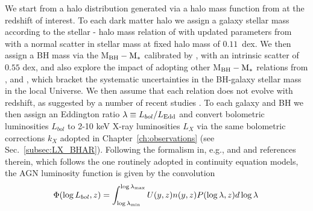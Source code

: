 We start from a halo distribution generated via a halo mass function from \citet{2008ApJ...688..709T} at the redshift of interest. To each dark matter halo we assign a galaxy stellar mass according to the stellar - halo mass relation of \citet[][]{moster10} with updated parameters from \citet[][Eq.~5]{2019MNRAS.483.2506G} with a normal scatter in stellar mass at fixed halo mass of $0.11$~dex.
We then assign a BH mass via the M$_{\rm BH}-{\rm M}_*$ calibrated by \citet{2015ApJ...813...82R}, with an intrinsic scatter of $0.55$ dex, and also explore the impact of adopting other M$_{\rm BH}-{\rm M}_*$ relations from \citet{2016MNRAS.460.3119S}, \citet{2018ApJ...869..113D} and \citet{2019ApJ...876..155S}, which bracket the systematic uncertainties in the BH-galaxy stellar mass in the local Universe. 
We then assume that each relation does not evolve with redshift, as suggested by a number of recent studies \citep[e.g.][and Fig.~\ref{fig:comp_models}]{2019ApJ...885L..36D, Suh20, Shankar20MNRAS}.
To each galaxy and BH we then assign an Eddington ratio $\lambda\equiv L_{bol}/L_{\rm Edd}$ and convert bolometric luminosities $L_{bol}$ to 2-10 keV X-ray luminosities $L_X$ via the same bolometric corrections $k_X$ adopted in Chapter~\ref{ch:observations} (see Sec.~\ref{subsec:LX_BHAR}). Following the formalism in, e.g., \citet{Shankar13Acc} and \citet{Allevato21} and references therein, which follows the one routinely adopted in continuity equation models, the AGN luminosity function is given by the convolution
\begin{equation}
\Phi(\log L_{bol},z)=\int_{\log \lambda_{\rm min}}^{\log \lambda_{\rm max}}U(y,z) n(y,z) P(\log \lambda,z)d\log \lambda \, 
\label{eq:PhiL}
\end{equation}

